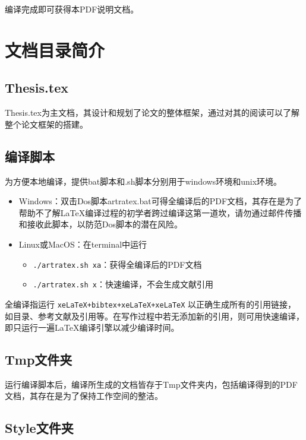 编译完成即可获得本PDF说明文档。

\section{文档目录简介}

\subsection{Thesis.tex}

Thesis.tex为主文档，其设计和规划了论文的整体框架，通过对其的阅读可以了解整个论文框架的搭建。

\subsection{编译脚本}

为方便本地编译，提供bat脚本和.sh脚本分别用于windows环境和unix环境。

\begin{itemize}
    \item Windows：双击Dos脚本artratex.bat可得全编译后的PDF文档，其存在是为了帮助不了解LaTeX编译过程的初学者跨过编译这第一道坎，请勿通过邮件传播和接收此脚本，以防范Dos脚本的潜在风险。
    \item Linux或MacOS：在terminal中运行
        \begin{itemize}
            \item \verb|./artratex.sh xa|：获得全编译后的PDF文档
            \item \verb|./artratex.sh x|：快速编译，不会生成文献引用
        \end{itemize}
\end{itemize}

全编译指运行 \verb|xeLaTeX+bibtex+xeLaTeX+xeLaTeX| 以正确生成所有的引用链接，如目录、参考文献及引用等。在写作过程中若无添加新的引用，则可用快速编译，即只运行一遍LaTeX编译引擎以减少编译时间。

\subsection{Tmp文件夹}

运行编译脚本后，编译所生成的文档皆存于Tmp文件夹内，包括编译得到的PDF文档，其存在是为了保持工作空间的整洁。

\subsection{Style文件夹}

